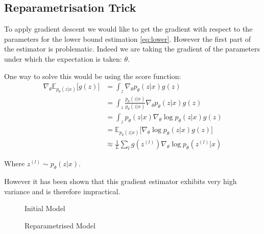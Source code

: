 \documentclass[11pt,oneside,openright]{report}
\begin{document}
\subsection{Reparametrisation Trick}
To apply gradient descent we would like to get the gradient with respect to the parameters for the lower bound estimation \ref{eq:lower}. However the first part of the estimator is problematic. Indeed we are taking the gradient of the parameters under which the expectation is taken: $\theta$.

One way to solve this would be using the score function:
 \begin{align}
\nabla_\theta \mathbb{E}_{p_\theta(z|x)}\big[ g(z) \big] &= \int_z \nabla_\theta p_\theta(z|x)  g(z)\\
 &= \int_z \frac{p_\theta(z|x)}{p_\theta(z|x)} \nabla_\theta p_\theta(z|x)  g(z) \\
 &= \int_z p_\theta(z|x) \nabla_\theta \log p_\theta(z|x)  g(z)\\
&= \mathbb{E}_{p_\theta(z|x)}\big[ \nabla_\theta \log p_\theta(z|x) g(z)  \big]\\
&\approx \frac{1}{L} \sum_l  g(z^{(l)}) \nabla_\theta \log p_\theta(z^{(l)}|x)
\end{align}

Where $z^{(l)} \sim p_\theta(z|x)$.

However it has been shown that this gradient estimator exhibits very high variance and is therefore impractical.

\begin{figure}[H]
    \centering
    \begin{minipage}{0.45\textwidth}
        \centering
{}
        \caption{Initial Model}
    \end{minipage}\hfill
    \begin{minipage}{0.45\textwidth}
        \centering
{}
        \caption{Reparametrised Model}
    \end{minipage}
\end{figure}
\end{document}
